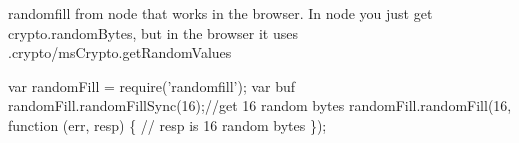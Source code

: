 \href{https://www.npmjs.org/package/randomfill}{\tt }

randomfill from node that works in the browser. In node you just get crypto.\+random\+Bytes, but in the browser it uses .crypto/ms\+Crypto.\+get\+Random\+Values


\begin{DoxyCode}
var randomFill = require('randomfill');
var buf
randomFill.randomFillSync(16);//get 16 random bytes
randomFill.randomFill(16, function (err, resp) \{
  // resp is 16 random bytes
\});
\end{DoxyCode}
 